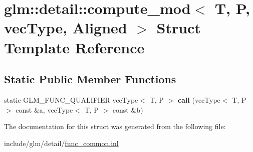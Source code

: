 \hypertarget{structglm_1_1detail_1_1compute__mod}{}\section{glm\+:\+:detail\+:\+:compute\+\_\+mod$<$ T, P, vec\+Type, Aligned $>$ Struct Template Reference}
\label{structglm_1_1detail_1_1compute__mod}
\subsection*{Static Public Member Functions}
\begin{DoxyCompactItemize}
\item 
\mbox{\label{structglm_1_1detail_1_1compute__mod_ade02ee494fe3e732a438962d23a8584b}} 
static G\+L\+M\+\_\+\+F\+U\+N\+C\+\_\+\+Q\+U\+A\+L\+I\+F\+I\+ER vec\+Type$<$ T, P $>$ {\bfseries call} (vec\+Type$<$ T, P $>$ const \&a, vec\+Type$<$ T, P $>$ const \&b)
\end{DoxyCompactItemize}


The documentation for this struct was generated from the following file\+:\begin{DoxyCompactItemize}
\item 
include/glm/detail/\hyperlink{func__common_8inl}{func\+\_\+common.\+inl}\end{DoxyCompactItemize}
